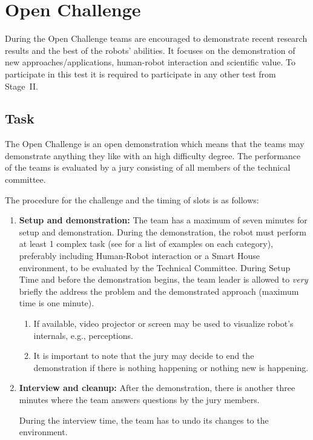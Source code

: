 \newcommand{\bonusRobotCoop}{5~}

\section{Open Challenge}
\label{sec:test_open_challenge}

During the Open Challenge teams are encouraged to demonstrate recent research results and the best of the robots' abilities. It focuses on the demonstration of new approaches/applications, human-robot interaction and scientific value. To participate in this test it is required to participate in any other test from Stage~II.

\subsection{Task}

The Open Challenge is an open demonstration which means that the teams may demonstrate anything they like with an high difficulty degree. The performance of the teams is evaluated by a jury consisting of all members of the technical committee.

The procedure for the challenge and the timing of slots is as follows:
\begin{enumerate}
  \item \textbf{Setup and demonstration:} The team has a maximum of seven minutes for setup and demonstration. During the demonstration, the robot must perform at least 1 complex task (see for a list of examples on each category), preferably including Human-Robot interaction or a Smart House environment, to be evaluated by the Technical Committee. During Setup Time and before the demonstration begins, the team leader is allowed to \emph{very} briefly the address the problem and the demonstrated approach (maximum time is one minute).

	\begin{enumerate}
		\item If available, video projector or screen may be used to visualize robot's internals, e.g., perceptions.
		\item It is important to note that the jury may decide to end the demonstration if there is nothing happening or nothing new is happening.
	\end{enumerate}
  \item \textbf{Interview and cleanup:} After the demonstration, there is another three minutes where the team answers questions by the jury members.

  During the interview time, the team has to undo its changes to the environment.
\end{enumerate}

